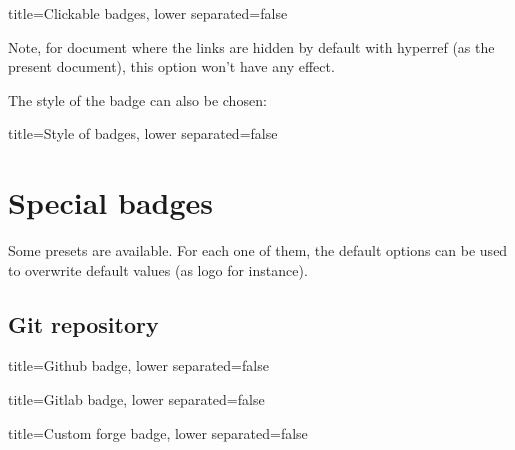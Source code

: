 \begin{tcblisting}{title={Clickable badges}, lower separated=false}
\end{tcblisting}

Note, for document where the links are hidden by default with \textsf{hyperref} (as the present document), this option won't have any effect.

\vspace{\baselineskip}

The style of the badge can also be chosen:

\begin{tcblisting}{title={Style of badges}, lower separated=false}
\end{tcblisting}




\section{Special badges}
\label{sec:special-badges}


Some presets are available.
For each one of them, the default options can be used to overwrite default values (as logo for instance).

\subsection{Git repository}

\begin{tcblisting}{title={Github badge}, lower separated=false}
\end{tcblisting}

\begin{tcblisting}{title={Gitlab badge}, lower separated=false}
\end{tcblisting}

\begin{tcblisting}{title={Custom forge badge}, lower separated=false}
\end{tcblisting}

